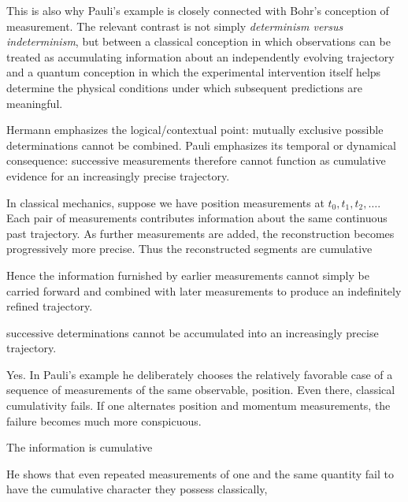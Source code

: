 This is also why Pauli's example is closely connected with Bohr's conception of measurement. The relevant contrast is not simply \emph{determinism versus indeterminism}, but between a classical conception in which observations can be treated as accumulating information about an independently evolving trajectory and a quantum conception in which the experimental intervention itself helps determine the physical conditions under which subsequent predictions are meaningful.


Hermann emphasizes the logical/contextual point: mutually exclusive possible determinations cannot be combined. Pauli emphasizes its temporal or dynamical consequence: successive measurements therefore cannot function as cumulative evidence for an increasingly precise trajectory.


In classical mechanics, suppose we have position measurements at $t_0,t_1,t_2,\ldots$. Each pair of measurements contributes information about the same continuous past trajectory. As further measurements are added, the reconstruction becomes progressively more precise. Thus the reconstructed segments are cumulative

Hence the information furnished by earlier measurements cannot simply be carried forward and combined with later measurements to produce an indefinitely refined trajectory.

successive determinations cannot be accumulated into an increasingly precise trajectory.

Yes. In Pauli’s example he deliberately chooses the relatively favorable case of a sequence of measurements of the same observable, position. Even there, classical cumulativity fails. If one alternates position and momentum measurements, the failure becomes much more conspicuous.

The information is cumulative

He shows that even repeated measurements of one and the same quantity fail to have the cumulative character they possess classically,













